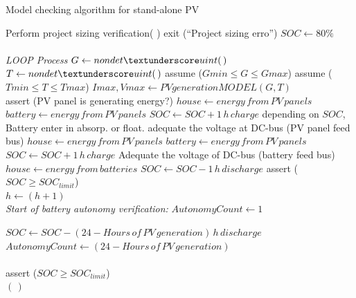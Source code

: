 \documentclass[journal]{IEEEtran}
\begin{document}
 \begin{algorithm}
 \caption{Model checking algorithm for stand-alone PV}
 \begin{algorithmic}[1]
 \renewcommand{\algorithmicrequire}{\textbf{Input:}}
 \renewcommand{\algorithmicensure}{\textbf{Output:}}
  \STATE Perform project sizing verification( )
  \STATE exit (``Project sizing erro'')  
  \ENDIF
  \STATE $SOC \leftarrow 80\%$ \\
 \\ \textit{LOOP Process}
  \STATE $G \leftarrow nondet \textunderscore uint(\,)$ 
  \STATE $T \leftarrow nondet \textunderscore uint(\,)$ 
  \STATE assume ($Gmin \leq G \leq Gmax$) 
  \STATE assume ($Tmin \leq T \leq Tmax$) 
  \STATE $Imax, Vmax \leftarrow PVgenerationMODEL (G,T)$ 
  \\
    \STATE assert (PV panel is generating energy?) 
    \STATE $house \leftarrow energy \, from \, PV \, panels$
    \STATE $battery \leftarrow energy \, from \, PV \, panels$ 
    \STATE $SOC \leftarrow SOC + 1\,h\, charge$
  	\STATE depending on $SOC$, Battery enter in absorp. or float.
	\STATE adequate the voltage at DC-bus (PV panel feed bus)
    \STATE $house \leftarrow energy \, from \, PV \, panels$
    \STATE $battery \leftarrow energy \, from \, PV \, panels$ 
    \STATE $SOC \leftarrow SOC + 1\,h\, charge$
  \ELSE
  	\STATE Adequate the voltage of DC-bus (battery feed bus)
	\STATE $house \leftarrow energy \, from \, batteries$
    \STATE $SOC \leftarrow SOC - 1\,h\, discharge$
    \STATE assert ($SOC \geq SOC_{limit}$)
    \\
  \ENDIF
  \STATE $h \leftarrow (h+1)$
  \ENDFOR
 \\ \textit{Start of battery autonomy verification:}
\STATE $AutonomyCount \leftarrow 1$

  \STATE $SOC \leftarrow SOC - ( 24 - Hours \, of \, PV \, generation)\,h\, discharge$
  \STATE $AutonomyCount \leftarrow ( 24 - Hours \, of \, PV \, generation)$
  \\  
  \\
  \STATE assert ($SOC \geq SOC_{limit}$)  
  \\
  \ENDWHILE
 \RETURN $(\,)$ 
 \end{algorithmic} 
 \label{alg:verification-algorithm}
 \end{algorithm}
\end{document}
